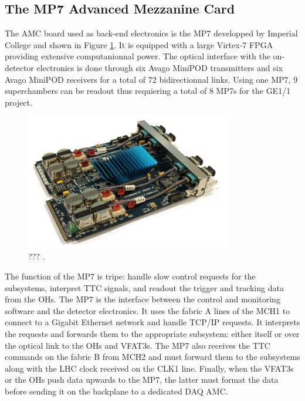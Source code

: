     \subsection{The MP7 Advanced Mezzanine Card}

      The AMC board used as back-end electronics is the MP7 \cite{MP7} developped by Imperial College and shown in Figure \ref{fig:II-2-daq-mp7}. It is equipped with a large Virtex-7 FPGA providing extensive computanionnal power. The optical interface with the on-detector electronics is done through six Avago MiniPOD transmitters and six Avago MiniPOD receivers for a total of 72 bidirectionnal links. Using one MP7, 9 superchambers can be readout thus requiering a total of 8 MP7s for the GE1/1 project. \\

      \begin{figure}[h!]
        \centering
        \includegraphics[width=0.8\textwidth]{img/II-2-daq/mp7.png}
        \caption{??? \cite{MP7}.}
        \label{fig:II-2-daq-mp7}
      \end{figure}

      The function of the MP7 is tripe: handle slow control requests for the subsystems, interpret TTC signals, and readout the trigger and tracking data from the OHs. The MP7 is the interface between the control and monitoring software and the detector electronics. It uses the fabric A lines of the MCH1 to connect to a Gigabit Ethernet network and handle TCP/IP requests. It interprets the requests and forwards them to the appropriate subsystem: either itself or over the optical link to the OHs and VFAT3s. The MP7 also receives the TTC commands on the fabric B from MCH2 and must forward them to the subsystems along with the LHC clock received on the CLK1 line. Finally, when the VFAT3s or the OHs push data upwards to the MP7, the latter must format the data before sending it on the backplane to a dedicated DAQ AMC.

